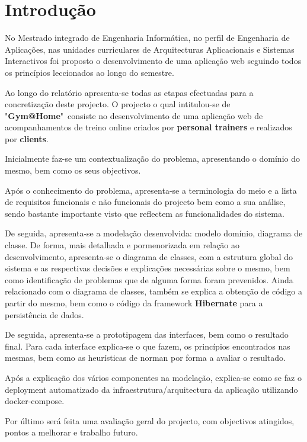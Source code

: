 \chapter{Introdução}
\label{chap:introducao}

\hspace{5mm} No Mestrado integrado de Engenharia Informática, no perfil de Engenharia de Aplicações, nas unidades curriculares de Arquitecturas Aplicacionais e Sistemas Interactivos foi proposto o desenvolvimento de uma aplicação web seguindo todos os princípios leccionados ao longo do semestre. 

\hspace{5mm} Ao longo do relatório apresenta-se todas as etapas efectuadas para a concretização deste projecto. \hspace{5mm} O projecto o qual intitulou-se de "\textbf{Gym@Home}"\ consiste no desenvolvimento de uma aplicação web de acompanhamentos de treino online criados por \textbf{personal trainers} e realizados por \textbf{clients}.

\hspace{5mm} Inicialmente faz-se um contextualização do problema, apresentando o domínio do mesmo, bem como os seus objectivos. 

\hspace{5mm} Após o conhecimento do problema, apresenta-se a terminologia do meio e a lista de requisitos funcionais e não funcionais do projecto bem como a sua análise, sendo bastante importante visto que reflectem as funcionalidades do sistema.

\hspace{5mm} De seguida, apresenta-se a modelação desenvolvida: modelo domínio, diagrama de classe. De forma, mais detalhada e pormenorizada em relação ao desenvolvimento, apresenta-se o diagrama de classes, com a estrutura global do sistema e as respectivas decisões e explicações necessárias sobre o mesmo, bem como identificação de problemas que de alguma forma foram prevenidos. Ainda relacionado com o diagrama de classes, também se explica a obtenção de código a partir do mesmo, bem como o código da framework \textbf{Hibernate} para a persistência de dados.

\hspace{5mm} De seguida, apresenta-se a prototipagem das interfaces, bem como o resultado final. Para cada interface explica-se o que fazem, os princípios encontrados nas mesmas, bem como as heurísticas de norman por forma a avaliar o resultado.

\hspace{5mm} Após a explicação dos vários componentes na modelação, explica-se como se faz o deployment automatizado da infraestrutura/arquitectura da aplicação utilizando docker-compose.

\hspace{5mm} Por último será feita uma avaliação geral do projecto, com objectivos atingidos, pontos a melhorar e trabalho futuro.